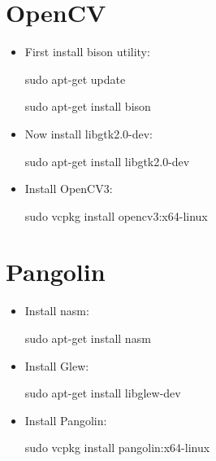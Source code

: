 \documentclass[a4paper,12pt]{book}
\begin{document}
\section{OpenCV}
\begin{itemize}
	\item First install bison utility:
	
	\vspace{3mm}
	sudo apt-get update
	
	\vspace{0.05mm}
	sudo apt-get install bison
	\vspace{3mm}
	
	\item Now install libgtk2.0-dev:
	
	\vspace{3mm}
	sudo apt-get install libgtk2.0-dev
	\vspace{3mm}
	\item Install OpenCV3:
	
	\vspace{3mm}
	sudo vcpkg install opencv3:x64-linux
	\vspace{3mm}
\end{itemize}
\section{Pangolin}
\begin{itemize}
	\item Install nasm:
	
	\vspace{3mm}
	sudo apt-get install nasm
	\vspace{3mm}
	\item Install Glew:
	
	\vspace{3mm}
	sudo apt-get install libglew-dev
	\vspace{3mm}
	\item Install Pangolin:
	
	\vspace{3mm}
	sudo vcpkg install pangolin:x64-linux
	\vspace{3mm}
\end{itemize}
\end{document}
